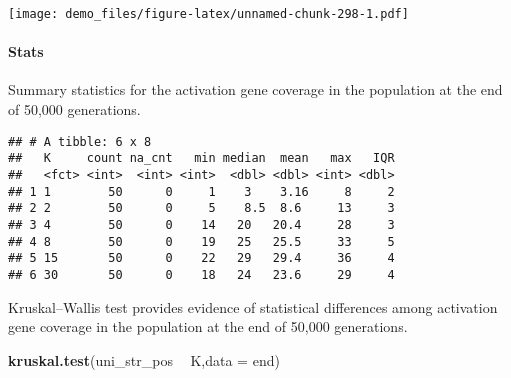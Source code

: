 \documentclass[]{book}
\newenvironment{Shaded}{\begin{snugshade}}{\end{snugshade}}
\newcommand{\DataTypeTok}[1]{\textcolor[rgb]{0.13,0.29,0.53}{#1}}
\newcommand{\KeywordTok}[1]{\textcolor[rgb]{0.13,0.29,0.53}{\textbf{#1}}}
\newcommand{\NormalTok}[1]{#1}
\newcommand{\OperatorTok}[1]{\textcolor[rgb]{0.81,0.36,0.00}{\textbf{#1}}}
\newcommand{\OtherTok}[1]{\textcolor[rgb]{0.56,0.35,0.01}{#1}}
\newcommand{\StringTok}[1]{\textcolor[rgb]{0.31,0.60,0.02}{#1}}
\let\oldparagraph\paragraph
\renewcommand{\paragraph}[1]{\oldparagraph{#1}\mbox{}}
\begin{document}
\texttt{[image: demo\_files/figure-latex/unnamed-chunk-298-1.pdf]}

\hypertarget{stats-57}{%
\paragraph{Stats}\label{stats-57}}

Summary statistics for the activation gene coverage in the population at the end of 50,000 generations.

\begin{Shaded}
\end{Shaded}

\begin{verbatim}
## # A tibble: 6 x 8
##   K     count na_cnt   min median  mean   max   IQR
##   <fct> <int>  <int> <int>  <dbl> <dbl> <int> <dbl>
## 1 1        50      0     1    3    3.16     8     2
## 2 2        50      0     5    8.5  8.6     13     3
## 3 4        50      0    14   20   20.4     28     3
## 4 8        50      0    19   25   25.5     33     5
## 5 15       50      0    22   29   29.4     36     4
## 6 30       50      0    18   24   23.6     29     4
\end{verbatim}

Kruskal--Wallis test provides evidence of statistical differences among activation gene coverage in the population at the end of 50,000 generations.

\begin{Shaded}
\begin{Highlighting}[]
\KeywordTok{kruskal.test}\NormalTok{(uni_str_pos }\OperatorTok{~}\StringTok{ }\NormalTok{K,}\DataTypeTok{data =}\NormalTok{ end)}
\end{Highlighting}
\end{Shaded}
\end{document}
